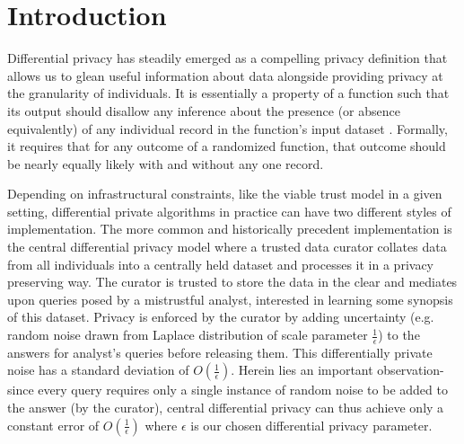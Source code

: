 \section{Introduction}

Differential privacy has steadily emerged as a compelling privacy definition that allows us to glean useful information about data alongside providing privacy at the granularity of individuals. %
It is essentially a property of a function such that its output  should disallow any inference about the
 presence (or absence equivalently) of any individual record in the function’s input dataset \cite{dwork}. 
Formally, it requires that for any outcome of a randomized function, that outcome should be nearly equally likely with and without any one record. 
\par
Depending on infrastructural constraints, like the viable trust model in a given setting, differential private algorithms in practice can have two different styles of implementation.  The more common and historically precedent implementation is the central differential privacy model where a trusted data curator collates data from all individuals into a centrally held dataset and processes it in a privacy preserving way. %
 The curator is trusted to store the data in the clear and mediates upon queries posed by a mistrustful analyst, interested in learning some synopsis of this dataset. Privacy is enforced by the curator by adding uncertainty (e.g. random noise drawn from Laplace distribution of scale parameter $\frac{1}{\epsilon}$) to the answers for analyst's queries before releasing them.  This differentially private noise has a standard deviation of $O(\frac{1}{\epsilon})$. Herein lies an important observation- since every query requires only a single instance of random noise to be added to the answer (by the curator), central differential privacy can thus achieve only a constant error of $O(\frac{1}{\epsilon})$ where $\epsilon$ is our chosen differential privacy parameter. 
